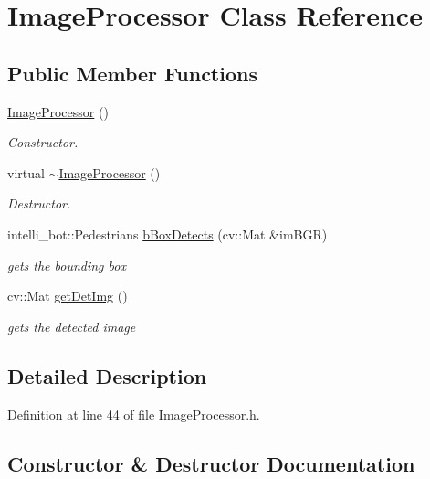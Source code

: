 \hypertarget{class_image_processor}{}\section{Image\+Processor Class Reference}
\label{class_image_processor}
\subsection*{Public Member Functions}
\begin{DoxyCompactItemize}
\item 
\hyperlink{class_image_processor_aa9201a4d14b20ac968919145db3a588b}{Image\+Processor} ()
\begin{DoxyCompactList}\small\item\em Constructor. \end{DoxyCompactList}\item 
virtual \hyperlink{class_image_processor_a2ff83cf5f0986ed04b7799499fe0defc}{$\sim$\+Image\+Processor} ()
\begin{DoxyCompactList}\small\item\em Destructor. \end{DoxyCompactList}\item 
intelli\+\_\+bot\+::\+Pedestrians \hyperlink{class_image_processor_a509de78c3ff02a2d6130f74d8a858a33}{b\+Box\+Detects} (cv\+::\+Mat \&im\+B\+GR)
\begin{DoxyCompactList}\small\item\em gets the bounding box \end{DoxyCompactList}\item 
cv\+::\+Mat \hyperlink{class_image_processor_a5c1ee13c914c45d1fc0a60f2dae5e945}{get\+Det\+Img} ()
\begin{DoxyCompactList}\small\item\em gets the detected image \end{DoxyCompactList}\end{DoxyCompactItemize}


\subsection{Detailed Description}


Definition at line 44 of file Image\+Processor.\+h.



\subsection{Constructor \& Destructor Documentation}
